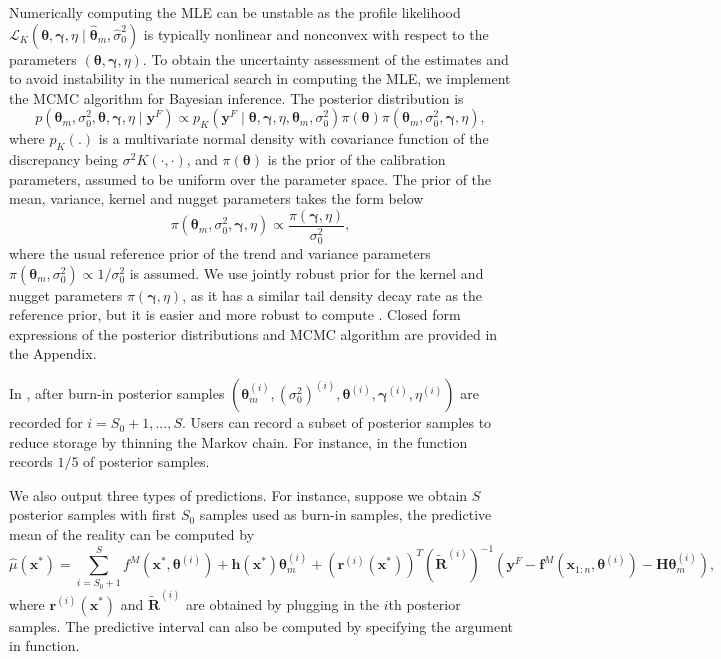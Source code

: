 Numerically computing the MLE  can be unstable  as the profile likelihood  $\mathcal L_K( \bm \theta, \bm \gamma, \eta\mid {\bm \hat \theta_m}, \hat \sigma^2_0 )$ is {typically} nonlinear and nonconvex with respect to the parameters $(\bm \theta, \bm \gamma, \eta)$. 
To obtain the uncertainty assessment of the estimates and to avoid instability in the numerical search in computing the MLE, we implement the MCMC algorithm for Bayesian inference. The posterior distribution is  
\begin{equation}
p(\bm \theta_m, \sigma^2_0, \bm \theta, \bm \gamma, \eta\mid \mathbf y^F) \propto  p_K(\mathbf y^F \mid \bm \theta, \bm \gamma, \eta, {\bm  \theta_m},  \sigma^2_0 ) \pi(\bm \theta) \pi({\bm  \theta_m},  \sigma^2_0, \bm \gamma,\eta), 
\label{equ:post}
\end{equation}
where $p_K(.)$ is a multivariate normal density with covariance function of the discrepancy being $\sigma^2K(\cdot,\cdot)$, and $\pi(\bm \theta)$ is the prior of the calibration parameters, assumed to be uniform over the parameter space. The prior of the mean, variance, kernel and nugget parameters takes the form below  
\[  \pi({\bm  \theta_m},  \sigma^2_0, \bm \gamma,\eta) \propto \frac{\pi(\bm \gamma,\eta)}{\sigma^2_0},   \]
where the usual reference prior of the trend and variance parameters $\pi({\bm  \theta_m},  \sigma^2_0)\propto 1/\sigma^2_0$ is assumed. We use jointly robust prior  for the kernel and nugget parameters $\pi(\bm \gamma,\eta)$,  as it has a similar tail density decay rate as  the reference prior, but it is easier and more robust to compute \citep{gu2019jointly}.  Closed form expressions of the posterior distributions and MCMC algorithm are provided in the Appendix. 


In , after burn-in posterior samples $(\bm \theta^{(i)}_m, (\sigma^2_0)^{(i)}, \bm \theta^{(i)}, \bm \gamma^{(i)}, \eta^{(i)})$ are recorded for $i=S_0+1,...,S$. Users can  record a subset of posterior samples {to reduce storage} by thinning the Markov chain. For instance,   in the  function  {records $1/5$ of  posterior samples}.

  We also output three types of predictions.    For instance, suppose we obtain $S$ posterior samples with first $S_0$ samples used as burn-in samples, the predictive mean of the reality can be computed by 
\[ \hat \mu(\mathbf x^*)=\sum^S_{i=S_0+1} f^M(\mathbf x^*,  {\bm \theta}^{(i)} )+\mathbf h(\mathbf x^*)  {\bm \theta_m^{(i)}}+ (\mathbf r^{(i)}(\mathbf x^*))^T  (\tilde {\mathbf R}^{(i)})^{-1}(\mathbf y^F- \mathbf f^M(\mathbf x_{1:n}, {\bm \theta}^{(i)})-\mathbf H {\bm \theta_m^{(i)}} ), \]
where $\mathbf r^{(i)}(\mathbf x^*)$  and ${\mathbf {\tilde R}}^{(i)}$ are obtained by plugging in the $i$th  posterior samples. The  predictive interval can also be computed  by specifying the argument  in  function.


